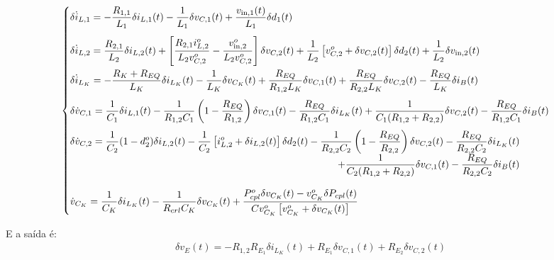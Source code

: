 \begin{gather}
  \begin{cases}
  \delta \dot{i}_{L,1} = \displaystyle - \frac{R_{1,1}}{L_1} \delta i_{L,1}(t) - \frac{1}{L_1} \delta v_{C,1}(t) + \frac{v_{\text{in}, 1}(t)}{L_1} \delta d_1(t) \\[12pt]
  \delta \dot{i}_{L,2} = \displaystyle \frac{R_{2,1}}{L_2} \delta i_{L,2}(t)
  + \left[\frac{R_{2,1} i_{L,2}^o}{L_2 v_{C,2}^o} - \frac{v_{\text{in},2}^o}{L_2 v_{C,2}^o}\right] \delta v_{C,2}(t) + \frac{1}{L_2} \left[v_{C,2}^o + \delta v_{C,2}(t)\right] \delta d_2(t) + \frac{1}{L_2} \delta v_{\text{in},2}(t) \\[12pt]
  \delta \dot{i}_{L_K} = \displaystyle - \frac{R_K + R_{EQ}}{L_K} \delta i_{L_K}(t)
  - \frac{1}{L_K} \delta v_{C_K}(t)
  + \frac{R_{EQ}}{{R_{1,2}}L_K} \delta v_{C,1}(t)
  + \frac{R_{EQ}}{R_{2,2}L_K} \delta v_{C,2}(t)
  - \frac{R_{EQ}}{L_K} \delta i_B(t) \\[12pt]
  \delta \dot v_{C,1} = \displaystyle \frac{1}{C_1} \delta i_{L,1}(t)
  - \frac{1}{R_{1,2}C_1} \left(1 - \frac{R_{EQ}}{{R_{1,2}}}\right) \delta v_{C,1}(t)
  - \frac{R_{EQ}}{R_{1,2} C_1} \delta i_{L_K}(t)
  + \frac{1}{C_1 (R_{1,2} + R_{2,2})} \delta v_{C,2}(t)
  - \frac{R_{EQ}}{R_{1,2} C_1} \delta i_B(t) \\[12pt]
  \begin{aligned}
    \delta \dot v_{C,2} = \displaystyle \frac{1}{C_2} (1 - d_2^o) \delta i_{L,2}(t) - \frac{1}{C_2} \left[i_{L,2}^o + \delta i_{L,2}(t)\right] \delta d_2(t)
    - \frac{1}{R_{2,2}C_2} \left(1 - \frac{R_{EQ}}{R_{2,2}}\right) \delta v_{C,2}(t)  
    - \frac{R_{EQ}}{R_{2,2} C_2} \delta i_{L_K}(t) \\+ \frac{1}{C_2(R_{1,2} + R_{2,2})}  \delta v_{C,1}(t) - \frac{R_{EQ}}{R_{2,2} C_2} \delta i_B(t) \\[12pt]
  \end{aligned} \\
  \dot{v}_{C_K} = \displaystyle \frac{1}{C_K} \delta i_{L_K}(t)
  - \frac{1}{R_{crl} C_K} \delta v_{C_K}(t)
  + \frac{P_{cpl}^o \delta v_{C_K}(t) - v_{C_K}^o \delta P_{cpl}(t)}{Cv_{C_K}^o\left[v_{C_K}^o + \delta v_{C_K}(t)\right]}  
\end{cases}
\end{gather}

E a saída é:
\begin{gather}
  \delta v_E(t) = - R_{1,2} R_{E_1} \delta i_{L_K}(t) + R_{E_1} \delta v_{C,1}(t) + R_{E_2} \delta v_{C,2}(t)
\end{gather}

